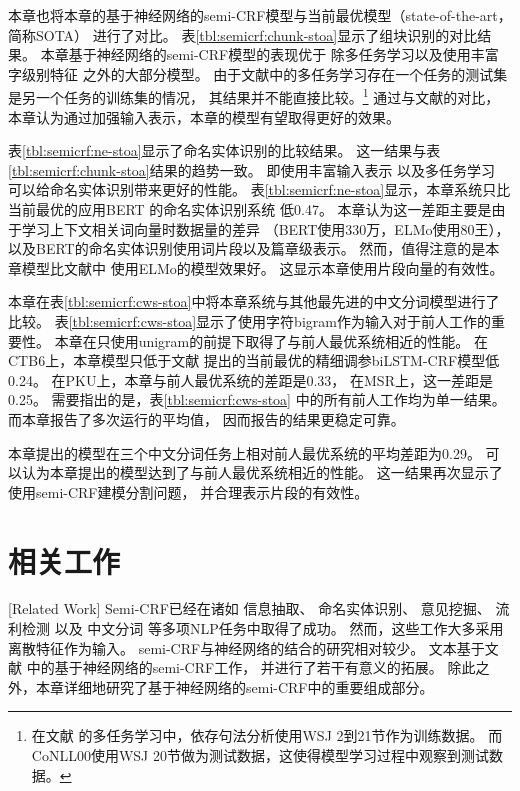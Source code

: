 本章也将本章的基于神经网络的semi-CRF模型与当前最优模型（state-of-the-art，简称SOTA）
进行了对比。
表\ref{tbl:semicrf:chunk-stoa}显示了组块识别的对比结果。
本章基于神经网络的semi-CRF模型的表现优于
除多任务学习\cite{clark-EtAl:2018:EMNLP}以及使用丰富字级别特征\cite{akbik-blythe-vollgraf:2018:C18-1}
之外的大部分模型。
由于文献中的多任务学习存在一个任务的测试集是另一个任务的训练集的情况，
其结果并不能直接比较。\footnote{在文献
	的多任务学习中，依存句法分析使用WSJ 2到21节作为训练数据。
	而CoNLL00使用WSJ 20节做为测试数据，这使得模型学习过程中观察到测试数据。
}
通过与文献的对比，
本章认为通过加强输入表示，本章的模型有望取得更好的效果。

表\ref{tbl:semicrf:ne-stoa}显示了命名实体识别的比较结果。
这一结果与表\ref{tbl:semicrf:chunk-stoa}结果的趋势一致。
即使用丰富输入表示\cite{akbik-blythe-vollgraf:2018:C18-1,DBLP:journals/corr/abs-1810-04805}
以及多任务学习\cite{clark-EtAl:2018:EMNLP}
可以给命名实体识别带来更好的性能。
表\ref{tbl:semicrf:ne-stoa}显示，本章系统只比
当前最优的应用BERT \cite{DBLP:journals/corr/abs-1810-04805}的命名实体识别系统
低0.47。
本章认为这一差距主要是由于学习上下文相关词向量时数据量的差异
（BERT使用330万，ELMo使用80王），
以及BERT的命名实体识别使用词片段以及篇章级表示。
然而，值得注意的是本章模型比文献中
使用ELMo的模型效果好。
这显示本章使用片段向量的有效性。

本章在表\ref{tbl:semicrf:cws-stoa}中将本章系统与其他最先进的中文分词模型进行了比较。
表\ref{tbl:semicrf:cws-stoa}显示了使用字符bigram作为输入对于前人工作的重要性。
本章在只使用unigram的前提下取得了与前人最优系统相近的性能。
在CTB6上，本章模型只低于文献
提出的当前最优的精细调参biLSTM-CRF模型低0.24。
在PKU上，本章与前人最优系统的差距是0.33，
在MSR上，这一差距是0.25。
需要指出的是，表\ref{tbl:semicrf:cws-stoa}
中的所有前人工作均为单一结果。
而本章报告了多次运行的平均值，
因而报告的结果更稳定可靠。

本章提出的模型在三个中文分词任务上相对前人最优系统的平均差距为0.29。
可以认为本章提出的模型达到了与前人最优系统相近的性能。
这一结果再次显示了使用semi-CRF建模分割问题，
并合理表示片段的有效性。

\section{相关工作}[Related Work]
Semi-CRF已经在诸如
信息抽取\cite{NIPS2005_427}、
命名实体识别\cite{okanohara-EtAl:2006:COLACL}、
意见挖掘\cite{yang-cardie:2012:EMNLP-CoNLL}、
流利检测\cite{ferguson-durrett-klein:2015:NAACL-HLT}
以及
中文分词\cite{andrew:2006:EMNLP,sun-EtAl:2009:NAACLHLT09}
等多项NLP任务中取得了成功。
然而，这些工作大多采用离散特征作为输入。
semi-CRF与神经网络的结合的研究相对较少。
文本基于文献
中的基于神经网络的semi-CRF工作，
并进行了若干有意义的拓展。
除此之外，本章详细地研究了基于神经网络的semi-CRF中的重要组成部分。

